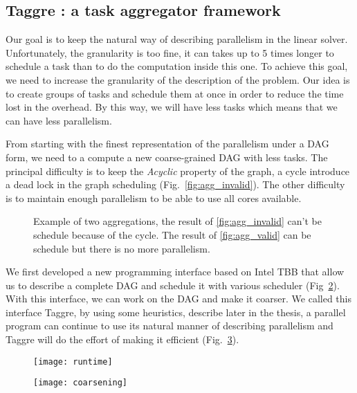 \subsection{Taggre : a task aggregator framework}
Our goal is to keep the natural way of describing parallelism in the linear solver.
%
Unfortunately, the granularity is too fine, it can takes up to 5 times longer to schedule a task than to do the computation inside this one.
%
To achieve this goal, we need to increase the granularity of the description of the problem.
%
Our idea is to create groups of tasks and schedule them at once in order to reduce the time lost in the overhead.
%
By this way, we will have less tasks which means that we can have less parallelism.


From starting with the finest representation of the parallelism under a DAG form, we need to a compute a new coarse-grained DAG with less tasks.
%
The principal difficulty is to keep the {\em Acyclic} property of the graph, a cycle introduce a dead lock in the graph scheduling (Fig.~\ref{fig:agg_invalid}).
%
The other difficulty is to maintain enough parallelism to be able to use all cores available.

\begin{figure}[!ht]
     \begin{center}
        \hspace{0.15\textwidth}%
    \end{center}
    \caption{Example of two aggregations, the result of \ref{fig:agg_invalid} can't be schedule because of the cycle. The result of \ref{fig:agg_valid} can be schedule but there is no more parallelism.}
    \label{fig:agg_basic}
\end{figure}


We first developed a new programming interface based on Intel TBB that allow us to describe a complete DAG and schedule it with various scheduler (Fig~\ref{fig:runtime}).
%
With this interface, we can work on the DAG and make it coarser.
%
We called this interface Taggre, by using some heuristics, describe later in the thesis, a parallel program can continue to use its natural manner of describing parallelism and Taggre will do the effort of making it efficient (Fig.~\ref{fig:coarsening}).

\begin{figure}[t!]
  \centering
  \texttt{[image: runtime]}
  \caption{}
  \label{fig:runtime}
\end{figure}

\begin{figure}[t!]
  \centering
  \texttt{[image: coarsening]}
  \caption{}
  \label{fig:coarsening}
\end{figure}
